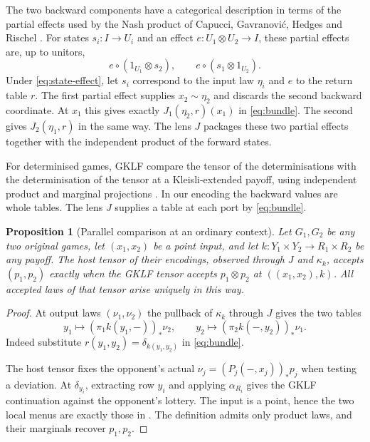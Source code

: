 \documentclass[11pt,a4paper]{article}
\newtheorem{proposition}[theorem]{Proposition}
\theoremstyle{definition}
\begin{document}
The two backward components have a categorical description in terms of the partial effects used by the Nash product of Capucci, Gavranovi\'{c}, Hedges and Rischel \cite[Proposition~14]{capucci}. For states $s_i:I\to U_i$ and an effect $e:U_1\otimes U_2\to I$, these partial effects are, up to unitors,
\[
    e\circ(1_{U_1}\otimes s_2),\qquad
    e\circ(s_1\otimes 1_{U_2}).
\]
Under \eqref{eq:state-effect}, let $s_i$ correspond to the input law $\eta_i$ and $e$ to the return table $r$. The first partial effect supplies $x_2\sim\eta_2$ and discards the second backward coordinate. At $x_1$ this gives exactly $J_1(\eta_2,r)(x_1)$ in \eqref{eq:bundle}. The second gives $J_2(\eta_1,r)$ in the same way. The lens $J$ packages these two partial effects together with the independent product of the forward states.

For determinised games, GKLF compare the tensor of the determinisations with the determinisation of the tensor at a Kleisli-extended payoff, using independent product and marginal projections \cite[Lemma~9]{gklf}. In our encoding the backward values are whole tables. The lens $J$ supplies a table at each port by \eqref{eq:bundle}.

\begin{proposition}[Parallel comparison at an ordinary context]\label{prop:tensor}
    Let $G_1,G_2$ be any two original games, let $(x_1,x_2)$ be a point input, and let $k:Y_1\times Y_2\to R_1\times R_2$ be any payoff. The host tensor of their encodings, observed through $J$ and $\kappa_k$, accepts $(p_1,p_2)$ exactly when the GKLF tensor accepts $p_1\otimes p_2$ at $((x_1,x_2),k)$. All accepted laws of that tensor arise uniquely in this way.
\end{proposition}
\begin{proof}
    At output laws $(\nu_1,\nu_2)$ the pullback of $\kappa_k$ through $J$ gives the two tables
    \[
        y_1\mapsto (\pi_1 k(y_1,-))_*\nu_2,\qquad
        y_2\mapsto (\pi_2 k(-,y_2))_*\nu_1 .
    \]
    Indeed substitute $r(y_1,y_2)=\delta_{k(y_1,y_2)}$ in \eqref{eq:bundle}.

    The host tensor fixes the opponent's actual $\nu_j=(P_j(-,x_j))_*p_j$ when testing a deviation. At $\delta_{y_i}$, extracting row $y_i$ and applying $\alpha_{R_i}$ gives the GKLF continuation against the opponent's lottery. The input is a point, hence the two local menus are exactly those in \cite[Definition~5]{gklf}. The definition admits only product laws, and their marginals recover $p_1,p_2$.
\end{proof}
\end{document}
